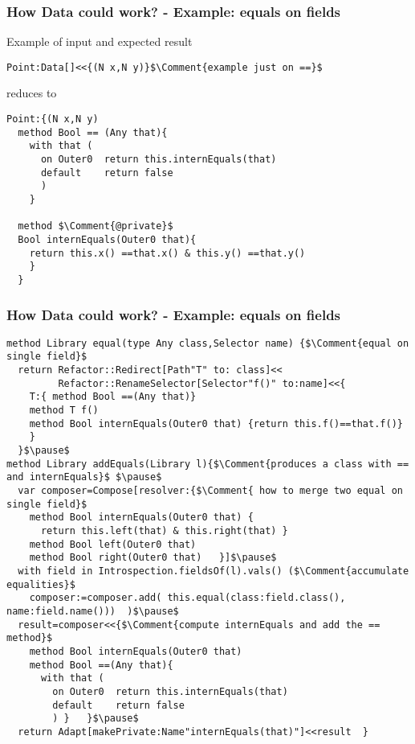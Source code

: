 \begin{frame}[fragile]
\frametitle{How Data could work? - Example: equals on fields}
Example of input and expected result
\begin{NiceCode}{59ex}{0.76}
\begin{lstlisting}
Point:Data[]<<{(N x,N y)}$\Comment{example just on ==}$
\end{lstlisting}
\end{NiceCode}
reduces to
\begin{NiceCode}{59ex}{0.76}
\begin{lstlisting}
Point:{(N x,N y)
  method Bool == (Any that){
    with that (
      on Outer0  return this.internEquals(that) 
      default    return false 
      )
    }

  method $\Comment{@private}$
  Bool internEquals(Outer0 that){
    return this.x() ==that.x() & this.y() ==that.y()
    }
  }
\end{lstlisting}
\end{NiceCode}

\end{frame}


\begin{frame}[fragile]
\frametitle{How Data could work? - Example: equals on fields}
\begin{NiceCode}{59ex}{0.76}
\begin{lstlisting}
method Library equal(type Any class,Selector name) {$\Comment{equal on single field}$
  return Refactor::Redirect[Path"T" to: class]<<
         Refactor::RenameSelector[Selector"f()" to:name]<<{
    T:{ method Bool ==(Any that)}
    method T f()
    method Bool internEquals(Outer0 that) {return this.f()==that.f()}
    }  
  }$\pause$
method Library addEquals(Library l){$\Comment{produces a class with == and internEquals}$ $\pause$
  var composer=Compose[resolver:{$\Comment{ how to merge two equal on single field}$
    method Bool internEquals(Outer0 that) {
      return this.left(that) & this.right(that) }
    method Bool left(Outer0 that)
    method Bool right(Outer0 that)   }]$\pause$
  with field in Introspection.fieldsOf(l).vals() ($\Comment{accumulate equalities}$
    composer:=composer.add( this.equal(class:field.class(), name:field.name()))  )$\pause$
  result=composer<<{$\Comment{compute internEquals and add the == method}$
    method Bool internEquals(Outer0 that)
    method Bool ==(Any that){
      with that (
        on Outer0  return this.internEquals(that)
        default    return false
        ) }   }$\pause$
  return Adapt[makePrivate:Name"internEquals(that)"]<<result  }
\end{lstlisting}
\end{NiceCode}
\end{frame}


